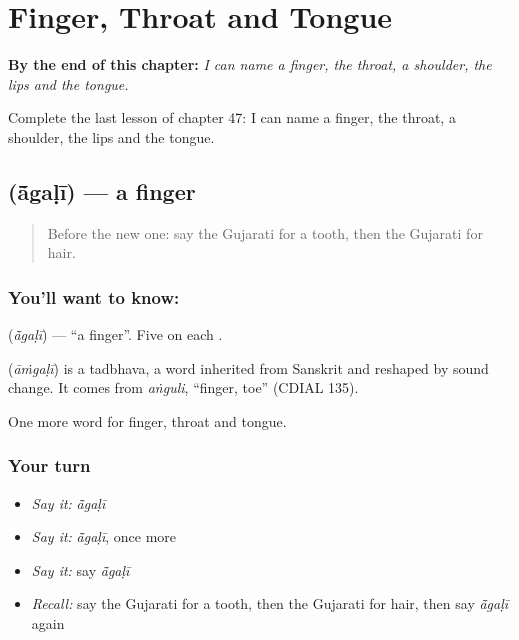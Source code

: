 
\chapter{Finger, Throat and Tongue}
\label{ch:gu-finger-throat-and-tongue}

\begin{chapteropening}
\textbf{By the end of this chapter:} \emph{I can name a finger, the throat, a shoulder, the lips and the tongue.}

Complete the last lesson of chapter 47: I can name a finger, the throat, a shoulder, the lips and the tongue.
\end{chapteropening}

\section[\texorpdfstring{\gu{આંગળી} (ā̃gaḷī)}{આંગળી (ā̃gaḷī)}]{ (ā̃gaḷī) — a finger}

\label{lesson:GU-C47-finger}



\begin{quote}
Before the new one: say the Gujarati for a tooth, then the Gujarati for hair.
\end{quote}

\subsection*{You'll want to know: }
\textbf{} (\emph{ā̃gaḷī}) — \textquotedblleft{}a finger\textquotedblright{}. Five on each \textbf{}.

\begin{cousinweb}
\textbf{} (\emph{āṁgaḷī}) is a tadbhava, a word inherited from Sanskrit and reshaped by sound change. It comes from \emph{aṅguli}, \textquotedblleft{}finger, toe\textquotedblright{} (CDIAL 135).
\end{cousinweb}

\begin{grammarlens}[title={What you've built}]
One more word for finger, throat and tongue.
\end{grammarlens}

\subsection*{Your turn}
\begin{itemize}
\raggedright
  \item \emph{Say it:} \emph{ā̃gaḷī}
  \item \emph{Say it:} \emph{ā̃gaḷī}, once more
  \item \emph{Say it:} say \emph{ā̃gaḷī}
  \item \emph{Recall:} say the Gujarati for a tooth, then the Gujarati for hair, then say \emph{ā̃gaḷī} again
\end{itemize}

